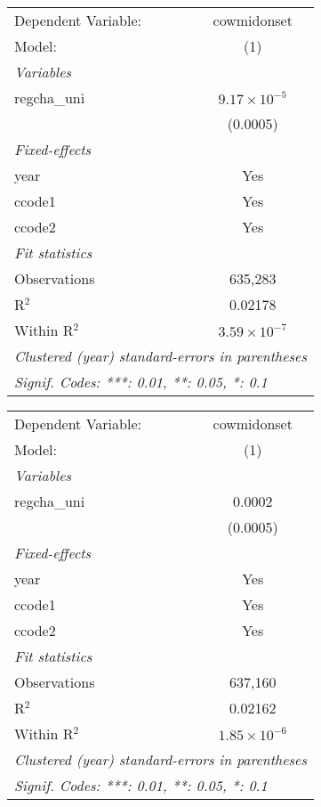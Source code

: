 \begingroup
\centering
\begin{tabular}{lc}
   \tabularnewline \midrule \midrule
   Dependent Variable: & cowmidonset\\  
   Model:              & (1)\\  
   \midrule
   \emph{Variables}\\
   regcha\_uni         & $9.17\times 10^{-5}$\\    
                       & (0.0005)\\   
   \midrule
   \emph{Fixed-effects}\\
   year                & Yes\\  
   ccode1              & Yes\\  
   ccode2              & Yes\\  
   \midrule
   \emph{Fit statistics}\\
   Observations        & 635,283\\  
   R$^2$               & 0.02178\\  
   Within R$^2$        & $3.59\times 10^{-7}$\\   
   \midrule \midrule
   \multicolumn{2}{l}{\emph{Clustered (year) standard-errors in parentheses}}\\
   \multicolumn{2}{l}{\emph{Signif. Codes: ***: 0.01, **: 0.05, *: 0.1}}\\
\end{tabular}
\par\endgroup



\begingroup
\centering
\begin{tabular}{lc}
   \tabularnewline \midrule \midrule
   Dependent Variable: & cowmidonset\\  
   Model:              & (1)\\  
   \midrule
   \emph{Variables}\\
   regcha\_uni         & 0.0002\\   
                       & (0.0005)\\   
   \midrule
   \emph{Fixed-effects}\\
   year                & Yes\\  
   ccode1              & Yes\\  
   ccode2              & Yes\\  
   \midrule
   \emph{Fit statistics}\\
   Observations        & 637,160\\  
   R$^2$               & 0.02162\\  
   Within R$^2$        & $1.85\times 10^{-6}$\\   
   \midrule \midrule
   \multicolumn{2}{l}{\emph{Clustered (year) standard-errors in parentheses}}\\
   \multicolumn{2}{l}{\emph{Signif. Codes: ***: 0.01, **: 0.05, *: 0.1}}\\
\end{tabular}
\par\endgroup


